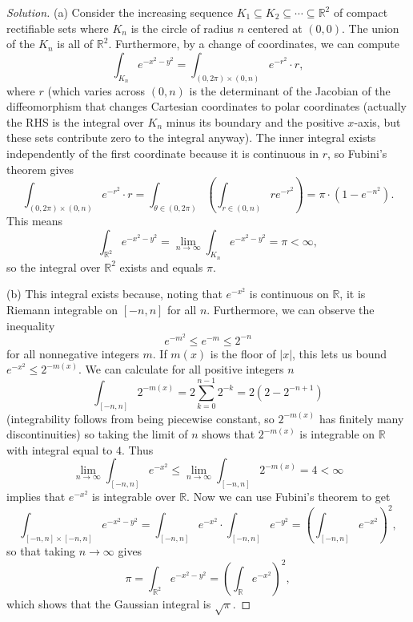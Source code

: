 \documentclass[10pt]{scrartcl}
\providecommand{\RR}{\mathbb R}
\newenvironment{soln}{\begin{proof}[Solution]}{\end{proof}}
\begin{document}
\begin{soln}
	(a) Consider the increasing sequence
	$K_1\subseteq K_2\subseteq\cdots\subseteq\RR^2$ of compact rectifiable sets
	where $K_n$ is the circle of radius $n$ centered at $(0,0)$.
	The union of the $K_n$ is all of $\RR^2$. Furthermore,
	by a change of coordinates, we can compute
	\[\int_{K_n}e^{-x^2-y^2} = \int_{(0,2\pi)\times(0,n)} e^{-r^2}\cdot r,\]
	where $r$ (which varies across $(0,n)$
	is the determinant of the Jacobian of the diffeomorphism
	that changes Cartesian coordinates to polar coordinates
	(actually the RHS is the integral over $K_n$ minus
	its boundary and the positive $x$-axis, but these sets
	contribute zero to the integral anyway).
	The inner integral exists independently of the first coordinate
	because it is continuous in $r$, so Fubini's theorem gives
	\[\int_{(0,2\pi)\times(0,n)} e^{-r^2}\cdot r =
	\int_{\theta\in (0,2\pi)}\left(\int_{r\in(0,n)} re^{-r^2}\right)
	= \pi\cdot \left(1 - e^{-n^2}\right).\]
	This means
	\[\int_{\RR^2} e^{-x^2-y^2} =
	\lim_{n\to\infty}\int_{K_n} e^{-x^2-y^2} = \pi < \infty,\]
	so the integral over $\RR^2$ exists and equals $\pi$.
	
	(b) This integral exists because, noting that $e^{-x^2}$
	is continuous on $\RR$, it is Riemann integrable on $[-n,n]$ for all $n$.
	Furthermore, we can observe the inequality
	\[e^{-m^2} \le e^{-m} \le 2^{-n}\]
	for all nonnegative integers $m$.
	If $m(x)$ is the floor of $|x|$, this lets us bound $e^{-x^2}\le 2^{-m(x)}$.
	We can calculate for all positive integers $n$
	\[\int_{[-n,n]} 2^{-m(x)} = 2\sum_{k=0}^{n-1} 2^{-k} = 2(2 - 2^{-n+1})\]
	(integrability follows from being piecewise constant, so $2^{-m(x)}$
	has finitely many discontinuities)
	so taking the limit of $n$ shows that $2^{-m(x)}$ is integrable on $\RR$
	with integral equal to $4$. Thus
	\[\lim_{n\to\infty} \int_{[-n,n]}e^{-x^2}
	\le \lim_{n\to\infty} \int_{[-n,n]}2^{-m(x)} = 4 < \infty\]
	implies that $e^{-x^2}$ is integrable over $\RR$.
	Now we can use Fubini's theorem to get
	\[\int_{[-n,n]\times[-n,n]} e^{-x^2-y^2}
	= \int_{[-n,n]}e^{-x^2}\cdot \int_{[-n,n]}e^{-y^2}
	= \left(\int_{[-n,n]}e^{-x^2}\right)^2,\]
	so that taking $n\to\infty$ gives
	\[\pi = \int_{\RR^2}e^{-x^2-y^2} = \left(\int_\RR e^{-x^2}\right)^2,\]
	which shows that the Gaussian integral is $\sqrt\pi$.
\end{soln}
\end{document}

